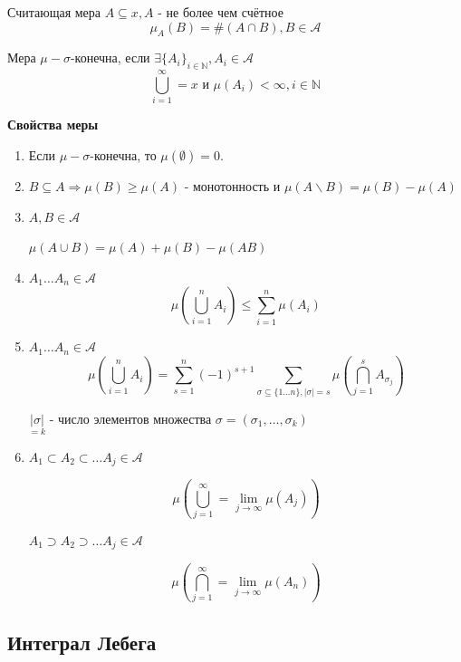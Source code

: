 \begin{definition}
	Считающая мера $A \subseteq x, A$ - не более чем счётное
	\[ \mu_{A} (B) = \# (A \cap B), B \in \mathcal{A} \]
\end{definition}

\begin{definition}
	Мера $\mu - \sigma$-конечна, если $\exists \{ A_i \}_{i \in \mathbb{N}}, A_i \in \mathcal{A}$
	\[ \bigcup_{i=1}^{\infty} = x \text{ и } \mu (A_i) < \infty, i \in \mathbb{N} \]
\end{definition}

\begin{center}
	\textbf{Свойства меры}
\end{center}
\begin{enumerate}
	\item Если $\mu - \sigma$-конечна, то $\mu(\emptyset) = 0$.
	\item $B \subseteq A \Rightarrow \mu(B) \ge \mu(A)$ - монотонность и $\mu(A \backslash B) = \mu(B) - \mu(A)$
	\item $A, B \in \mathcal{A}$
	
	$\mu(A \cup B) = \mu(A) + \mu(B) - \mu(AB)$
	\item $A_1 \dots A_n \in \mathcal{A}$
	\[ \mu \left( \bigcup_{i=1}^n A_i \right) \le \sum_{i=1}^{n} \mu (A_i) \]
	\item $A_1 \dots A_n \in \mathcal{A}$
	\[ \mu \left( \bigcup_{i=1}^n A_i \right) = \sum_{s=1}^{n}(-1)^{s+1} \sum_{\sigma \subseteq \{1 \dots n\}, |\sigma|=s} \mu \left( \bigcap_{j=1}^s A_{\sigma_j} \right) \]
	\begin{remark}
		$\underset{=k}{|\sigma|}$ - число элементов множества $\sigma = (\sigma_1, \dots, \sigma_k)$
	\end{remark}
	\item $A_1 \subset A_2 \subset \dots A_j \in \mathcal{A}$
	
	\[ \mu \left( \bigcup_{j=1}^{\infty} = \lim_{j \to \infty} \mu(A_j) \right) \]
	
	$A_1 \supset A_2 \supset \dots A_j \in \mathcal{A}$
	
	\[ \mu \left( \bigcap_{j=1}^{\infty} = \lim_{j \to \infty} \mu(A_n) \right) \]
\end{enumerate}

\subsection{Интеграл Лебега}


